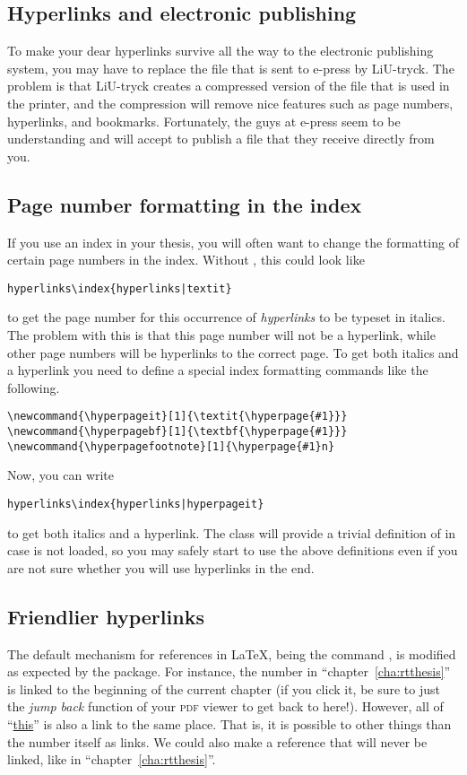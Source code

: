 \subsection{Hyperlinks and electronic publishing}
%
To make your dear hyperlinks survive all the way to the electronic publishing system, you may have to replace the file that is sent to e-press by LiU-tryck.  The problem is that LiU-tryck creates a compressed version of the file that is used in the printer, and the compression will remove nice features such as page numbers, hyperlinks, and bookmarks.  Fortunately, the guys at e-press seem to be understanding and will accept to publish a file that they receive directly from you.

\subsection{Page number formatting in the index}
%
If you use an index in your thesis, you will often want to change the formatting of certain page numbers in the index.  Without , this could look like
{\verbatimsize
\begin{verbatim}
hyperlinks\index{hyperlinks|textit}
\end{verbatim}}
to get the page number for this occurrence of \emph{hyperlinks} to be typeset in italics.  The problem with this is that this page number will not be a hyperlink, while other page numbers will be hyperlinks to the correct page.  To get both italics and a hyperlink you need to define a special index formatting commands like the following.
{\verbatimsize
\begin{verbatim}
\newcommand{\hyperpageit}[1]{\textit{\hyperpage{#1}}}
\newcommand{\hyperpagebf}[1]{\textbf{\hyperpage{#1}}}
\newcommand{\hyperpagefootnote}[1]{\hyperpage{#1}n}
\end{verbatim}}

Now, you can write
{\verbatimsize
\begin{verbatim}
hyperlinks\index{hyperlinks|hyperpageit}
\end{verbatim}}
to get both italics and a hyperlink.  The \rtthesis class will provide a trivial definition of  in case  is not loaded, so you may safely start to use the above definitions even if you are not sure whether you will use hyperlinks in the end.

\subsection{Friendlier hyperlinks}
%
The default mechanism for references in \LaTeX{}, being the command , is modified as expected by the  package.  For instance, the number in “chapter~\ref{cha:rtthesis}” is linked to the beginning of the current chapter (if you click it, be sure to just the \emph{jump back} function of your \textsc{pdf} viewer to get back to here!).  However, all of “\hyperref[cha:rtthesis]{this}” is also a link to the same place.  That is, it is possible to other things than the number itself as links.  We could also make a reference that will never be linked, like in “chapter~\ref*{cha:rtthesis}”.

